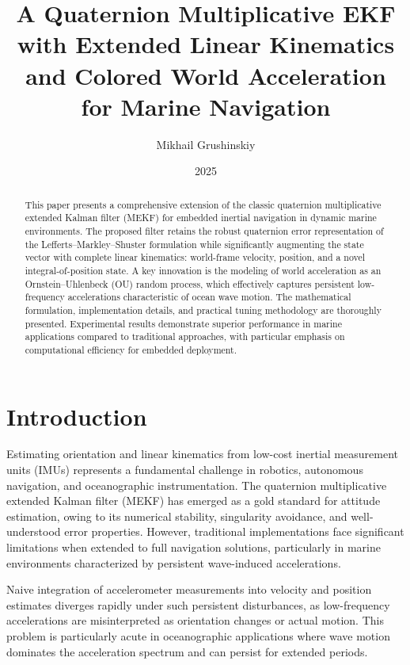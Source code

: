 \documentclass[11pt,letterpaper]{article}
\title{A Quaternion Multiplicative EKF with Extended Linear Kinematics and Colored World Acceleration for Marine Navigation}
\author{Mikhail Grushinskiy}
\date{2025}
\begin{document}
\maketitle

\begin{abstract}
This paper presents a comprehensive extension of the classic quaternion multiplicative extended Kalman filter (MEKF) for embedded inertial navigation in dynamic marine environments. The proposed filter retains the robust quaternion error representation of the Lefferts--Markley--Shuster formulation while significantly augmenting the state vector with complete linear kinematics: world-frame velocity, position, and a novel integral-of-position state. A key innovation is the modeling of world acceleration as an Ornstein--Uhlenbeck (OU) random process, which effectively captures persistent low-frequency accelerations characteristic of ocean wave motion. The mathematical formulation, implementation details, and practical tuning methodology are thoroughly presented. Experimental results demonstrate superior performance in marine applications compared to traditional approaches, with particular emphasis on computational efficiency for embedded deployment.
\end{abstract}

\section{Introduction}
\label{sec:introduction}

Estimating orientation and linear kinematics from low-cost inertial measurement units (IMUs) represents a fundamental challenge in robotics, autonomous navigation, and oceanographic instrumentation. The quaternion multiplicative extended Kalman filter (MEKF)  has emerged as a gold standard for attitude estimation, owing to its numerical stability, singularity avoidance, and well-understood error properties. However, traditional implementations face significant limitations when extended to full navigation solutions, particularly in marine environments characterized by persistent wave-induced accelerations.

Naive integration of accelerometer measurements into velocity and position estimates diverges rapidly under such persistent disturbances, as low-frequency accelerations are misinterpreted as orientation changes or actual motion. This problem is particularly acute in oceanographic applications where wave motion dominates the acceleration spectrum and can persist for extended periods.
\end{document}
